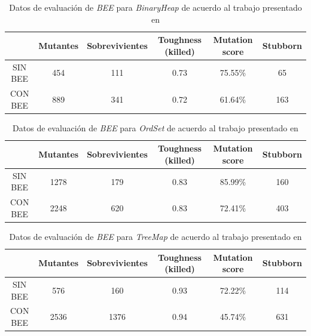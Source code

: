 \begin{table}[]
	\centering
	\scriptsize
	\def\arraystretch{0.95}
	\setlength\tabcolsep{0.5mm}
	\begin{tabular}{c|ccccc|}
		\cline{2-6}
		& Mutantes & Sobrevivientes & Toughness (killed) & Mutation score & Stubborn \\ \hline
		\multicolumn{1}{|c|}{SIN BEE} & 454 & 111 & 0.73 & 75.55\% & 65 \\ \hline
		\multicolumn{1}{|c|}{CON BEE} & 889 & 341 & 0.72 & 61.64\% & 163 \\ \hline
	\end{tabular}
	\caption{Datos de evaluaci\'on de \emph{BEE} para \emph{BinaryHeap} de acuerdo al trabajo presentado en \cite{bibliography.mutation.operators.beeBridaS17}}
	\label{tables.examples.bee.paperResults.binaryheap}
\end{table}

\begin{table}[]
	\centering
	\scriptsize
	\def\arraystretch{0.95}
	\setlength\tabcolsep{0.5mm}
	\begin{tabular}{c|ccccc|}
		\cline{2-6}
		& Mutantes & Sobrevivientes & Toughness (killed) & Mutation score & Stubborn \\ \hline
		\multicolumn{1}{|c|}{SIN BEE} & 1278 & 179 & 0.83 & 85.99\% & 160 \\ \hline
		\multicolumn{1}{|c|}{CON BEE} & 2248 & 620 & 0.83 & 72.41\% & 403 \\ \hline
	\end{tabular}
	\caption{Datos de evaluaci\'on de \emph{BEE} para \emph{OrdSet} de acuerdo al trabajo presentado en \cite{bibliography.mutation.operators.beeBridaS17}}
	\label{tables.examples.bee.paperResults.ordset}
\end{table}

\begin{table}[]
	\centering
	\scriptsize
	\def\arraystretch{0.95}
	\setlength\tabcolsep{0.5mm}
	\begin{tabular}{c|ccccc|}
		\cline{2-6}
		& Mutantes & Sobrevivientes & Toughness (killed) & Mutation score & Stubborn \\ \hline
		\multicolumn{1}{|c|}{SIN BEE} & 576 & 160 & 0.93 & 72.22\% & 114 \\ \hline
		\multicolumn{1}{|c|}{CON BEE} & 2536 & 1376 & 0.94 & 45.74\% & 631 \\ \hline
	\end{tabular}
	\caption{Datos de evaluaci\'on de \emph{BEE} para \emph{TreeMap} de acuerdo al trabajo presentado en \cite{bibliography.mutation.operators.beeBridaS17}}
	\label{tables.examples.bee.paperResults.treemap}
\end{table}

